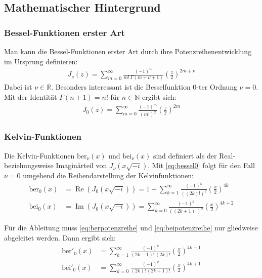 \documentclass[10pt,a4paper]{article}
\begin{document}
\subsection{Mathematischer Hintergrund}

\subsubsection{Bessel-Funktionen erster Art}

Man kann die Bessel-Funktionen erster Art durch ihre Potenzreihenentwicklung im Ursprung definieren:
\begin{align}
	J_\nu(z) = \sum^{\infty}_{m=0} \frac{\left( -1 \right)^m}{m! \, \Gamma(m + \nu + 1)} \left(\frac{z}{2}\right)^{2m+\nu}
\end{align}
Dabei ist $\nu \in \mathbb{R}$. Besonders interessant ist die Besselfunktion 0-ter Ordnung $\nu = 0$.
Mit der Identität $\Gamma(n+1) = n!$ für $n \in \mathbb{N}$ ergibt sich:
\begin{align}
	\label{eq:bessel0}
	J_0(z) = \sum^{\infty}_{m=0} \frac{\left( -1 \right)^m}{\left( m! \right)^2} \left( \frac{z}{2} \right)^{2m}
\end{align}

\subsubsection{Kelvin-Funktionen}

Die Kelvin-Funktionen $\mathrm{ber}_\nu(x)$ und $\mathrm{bei}_\nu(x)$ sind definiert als der Real-
beziehungsweise Imaginärteil von $J_\nu(x \sqrt{-i} )$. Mit \ref{eq:bessel0}
folgt für den Fall $\nu = 0$ umgehend die Reihendarstellung der Kelvinfunktionen:
\begin{align}
	\mathrm{ber}_0(x) &= \operatorname{Re}\left(J_0(x \sqrt{-i} )\right) = 1 + \sum^{\infty}_{k=1} \frac{\left( -1 \right)^k}{\left( \left(2k\right)! \right)^2} \left( \frac{x}{2} \right)^{4k} \label{eq:berpotenzreihe}\\
	\mathrm{bei}_0(x) &= \operatorname{Im}\left(J_0(x \sqrt{-i} )\right) = \sum^{\infty}_{k=0} \frac{\left( -1 \right)^k}{\left( \left(2k+1\right)! \right)^2} \left( \frac{x}{2} \right)^{4k+2}\label{eq:beipotenzreihe}
\end{align}

Für die Ableitung muss \ref{eq:berpotenzreihe} und \ref{eq:beipotenzreihe} nur gliedweise abgeleitet werden.
Dann ergibt sich:
\begin{align}
	\mathrm{ber}'_0(x) &= \sum^{\infty}_{k=1} \frac{\left( -1 \right)^k}{\left( 2k-1 \right)! \, \left( 2k \right)!} \left( \frac{x}{2} \right)^{4k-1}\\
	\mathrm{bei}'_0(x) &= \sum^{\infty}_{k=0} \frac{\left( -1 \right)^k}{\left( 2k \right)! \, \left( 2k+1 \right)!} \left( \frac{x}{2} \right)^{4k+1}
\end{align}
\end{document}
